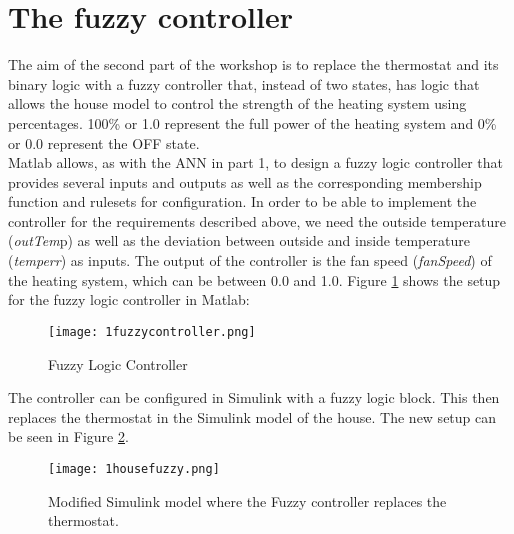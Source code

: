 \section{The fuzzy controller}
The aim of the second part of the workshop is to replace the thermostat and its binary logic with a fuzzy controller that, instead of two states, has logic that allows the house model to control the strength of the heating system using percentages. 100\% or 1.0 represent the full power of the heating system and 0\% or 0.0 represent the OFF state.\\
Matlab allows, as with the ANN in part 1, to design a fuzzy logic controller that provides several inputs and outputs as well as the corresponding membership function and rulesets for configuration. In order to be able to implement the controller for the requirements described above, we need the outside temperature (\textit{outTem}p) as well as the deviation between outside and inside temperature (\textit{temperr}) as inputs. The output of the controller is the fan speed (\textit{fanSpeed}) of the heating system, which can be between 0.0 and 1.0. Figure \ref{fuzzycontroller} shows the setup for the fuzzy logic controller in Matlab:
\begin{figure}[H]
	\centering
	\texttt{[image: 1fuzzycontroller.png]}
	\caption[Caption for LOF]{Fuzzy Logic Controller}
	\label{fuzzycontroller}
\end{figure}
The controller can be configured in Simulink with a fuzzy logic block. This then replaces the thermostat in the Simulink model of the house. The new setup can be seen in Figure \ref{housefuzzy}.
\begin{figure}[H]
	\centering
	\texttt{[image: 1housefuzzy.png]}
	\caption[Caption for LOF]{Modified Simulink model where the Fuzzy controller replaces the thermostat.}
	\label{housefuzzy}
\end{figure}
